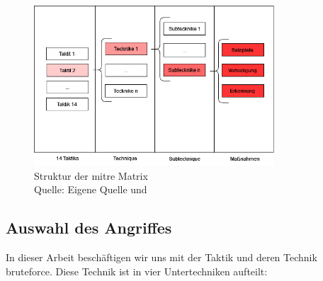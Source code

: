 \begin{figure}[H]
   \centering
   \includegraphics[width=0.8\textwidth]{assets/Mitre_structure.drawio.png}
   \caption[Struktur der \gls{mitre} Matrix]
   {Struktur der \gls{mitre} Matrix \\Quelle: Eigene Quelle und \citep{Mitre_Started}}
   \label{fig:ttp}
   \centering
\end{figure}


\subsection{Auswahl des Angriffes}
In dieser Arbeit beschäftigen wir uns mit der Taktik  und deren Technik \gls{bruteforce}. Diese Technik ist in vier Untertechniken aufteilt:

